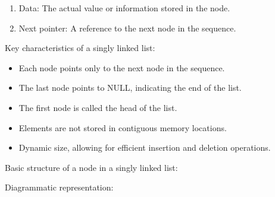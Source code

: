 \begin{enumerate}
\def\labelenumi{\arabic{enumi}.}
\tightlist
\item
  Data: The actual value or information stored in the node.
\item
  Next pointer: A reference to the next node in the sequence.
\end{enumerate}

Key characteristics of a singly linked list:

\begin{itemize}
\tightlist
\item
  Each node points only to the next node in the sequence.
\item
  The last node points to NULL, indicating the end of the list.
\item
  The first node is called the head of the list.
\item
  Elements are not stored in contiguous memory locations.
\item
  Dynamic size, allowing for efficient insertion and deletion
  operations.
\end{itemize}

Basic structure of a node in a singly linked list:

\begin{Shaded}
\begin{Highlighting}[]
     \NormalTok{(}
        \OperatorTok{=}
         \OperatorTok{=} 
\end{Highlighting}
\end{Shaded}

Diagrammatic representation:

\begin{Shaded}
\begin{Highlighting}[]
\end{Highlighting}
\end{Shaded}

